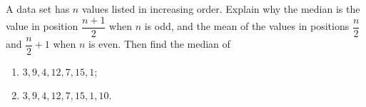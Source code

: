 A data set has $n$ values listed in increasing order. Explain why the median is the value in position $\dfrac{n+1}{2}$ when $n$ is odd, and the mean of the values in positions $\dfrac {n}{2}$ and $\dfrac {n}{2}+1$ when $n$ is even. Then find the median of
\begin{enumerate}
\item[(a)] $3,9,4,12,7,15,1$;
\item[(b)] $3,9,4,12,7,15,1,10$.
\end{enumerate}
